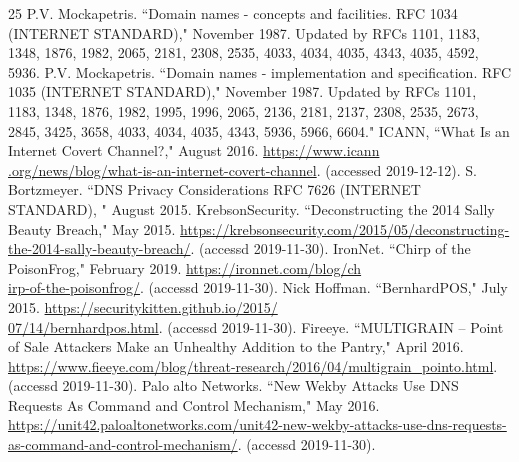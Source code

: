 \documentclass[12pt]{jarticle} %
\begin{document}
\newpage
%
\begin{thebibliography} {25}\small
  P.V. Mockapetris. ``Domain names - concepts and facilities. RFC 1034 (INTERNET STANDARD)," November 1987. Updated by RFCs 1101, 1183, 1348, 1876, 1982, 2065, 2181, 2308, 2535, 4033, 4034, 4035, 4343, 4035, 4592, 5936.
  P.V. Mockapetris. ``Domain names - implementation and specification. RFC 1035 (INTERNET STANDARD)," November 1987. Updated by RFCs 1101, 1183, 1348, 1876, 1982, 1995, 1996, 2065, 2136, 2181, 2137, 2308, 2535, 2673, 2845, 3425, 3658, 4033, 4034, 4035, 4343, 5936, 5966, 6604."
  ICANN, ``What Is an Internet Covert Channel?," August 2016. \href{https://www.icann.org/news/blog/what-is-an-internet-covert-channel}{https://www.icann\\.org/news/blog/what-is-an-internet-covert-channel}. (accessed 2019-12-12).
  S. Bortzmeyer. ``DNS Privacy Considerations RFC 7626 (INTERNET STANDARD), " August 2015.
  KrebsonSecurity. ``Deconstructing the 2014 Sally Beauty Breach," May 2015. \href{https://krebsonsecurity.com/2015/05/deconstructing-the-2014-sally-beauty-breach/}{https://krebsonsecurity.com/2015/05/deconstructing-the-2014-sally-beauty-breach/}. (accessd 2019-11-30).
  IronNet. ``Chirp of the PoisonFrog," February 2019. \href{https://ironnet.com/blog/chirp-of-the-poisonfrog/}{https://ironnet.com/blog/ch\\irp-of-the-poisonfrog/}. (accessd 2019-11-30).
  Nick Hoffman. ``BernhardPOS," July 2015. \href{https://securitykitten.github.io/2015/07/14/bernhardpos.html}{https://securitykitten.github.io/2015/\\07/14/bernhardpos.html}. (accessd 2019-11-30).
  Fireeye. ``MULTIGRAIN – Point of Sale Attackers Make an Unhealthy Addition to the Pantry," April 2016. \href{https://www.fieeye.com/blog/threat-research/2016/04/multigrain\_pointo.html}{https://www.fieeye.com/blog/threat-research/2016/04/multigrain\_pointo.html}. (accessd 2019-11-30).
  Palo alto Networks. ``New Wekby Attacks Use DNS Requests As Command and Control Mechanism," May 2016. \href{https://unit42.paloaltonetworks.com/unit42-new-wekby-attacks-use-dns-requests-as-command-and-control-mechanism/}{https://unit42.paloaltonetworks.com/unit42-new-wekby-attacks-use-dns-requests-as-command-and-control-mechanism/}. (accessd 2019-11-30).

\end{thebibliography}
\end{document}
